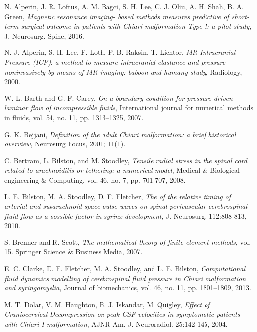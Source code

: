 \documentclass[a4paper,11pt,openright,twoside]{book}
\begin{document}
\begin{thebibliography}{100}

 N. Alperin, J. R. Loftus, A. M. Bagci, S. H. Lee, C. J. Oliu, A. H. Shah, B. A. Green, \emph{Magnetic resonance imaging- based methods measures predictive of short-term surgical outcome in patients with Chiari malformation Type I: a pilot study}, J. Neurosurg. Spine, 2016.

 N. J. Alperin, S. H. Lee, F. Loth, P. B. Raksin, T. Lichtor, \emph{MR-Intracranial Pressure (ICP): a method to measure intracranial elastance and pressure noninvasively by means of MR imaging: baboon and humany study}, Radiology, 2000.

 W. L. Barth and G. F. Carey, \emph{On a boundary condition for pressure-driven laminar flow of incompressible fluids}, International journal for numerical methods in fluids, vol. 54, no. 11, pp. 1313–1325, 2007.


 G. K. Bejjani, \emph{Definition of the adult Chiari malformation: a brief historical overview}, Neurosurg Focus, 2001; 11(1).

 C. Bertram, L. Bilston, and M. Stoodley, \emph{Tensile radial stress in the spinal cord related to arachnoiditis or tethering: a numerical model}, Medical \& Biological engineering \& Computing, vol. 46, no. 7, pp. 701-707, 2008.

 L. E. Bilston, M. A. Stoodley, D. F. Fletcher, \emph{The of the relative timing of arterial and subarachnoid space pulse waves on spinal perivascular cerebrospinal fluid flow as a possible factor in syrinx development}, J. Neurosurg. 112:808-813, 2010.

 S. Brenner and R. Scott, \emph{The mathematical theory of finite element methods}, vol. 15. Springer Science \& Business Media, 2007.

 E. C. Clarke, D. F. Fletcher, M. A. Stoodley, and L. E. Bilston, \emph{Computational fluid dynamics modelling of cerebrospinal fluid pressure in Chiari malformation and syringomyelia}, Journal of biomechanics, vol. 46, no. 11, pp. 1801–1809,
2013.

 M. T. Dolar, V. M. Haughton, B. J. Iskandar, M. Quigley, \emph{Effect of Craniocervical Decompression on peak CSF velocities in symptomatic patients with Chiari I malformation}, AJNR Am. J. Neuroradiol. 25:142-145, 2004.


\end{thebibliography}
\end{document}
